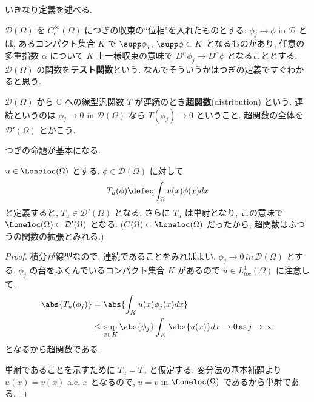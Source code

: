 \documentclass[openany, a4paper, oneside]{jsbook}
\begin{document}
いきなり定義を述べる.
\begin{defn}[テスト関数]
 $\mathcal{D}(\Omega)$ を $C_c^{\infty}(\Omega)$ につぎの収束の``位相"を入れたものとする:
 $\phi_j \to \phi$ in $\mathcal{D}$ とは,
 あるコンパクト集合 $K$ で $\supp \phi_j$, $\supp  \phi \subset K$ となるものがあり,
 任意の多重指数 $\alpha$ について $K$ 上一様収束の意味で $D^{\alpha}\phi_j \to D^{\alpha}\phi$ となることとする.
 $\mathcal{D}(\Omega)$ の関数を\textbf{テスト関数}という.
 なんでそういうかはつぎの定義ですぐわかると思う.
\end{defn}
\begin{defn}[超関数]
 $\mathcal{D}(\Omega)$ から $\mathbb{C}$ への線型汎関数
 $T$ が連続のとき\textbf{超関数}(distribution) という.
 連続というのは $\phi_j \to  0$ in $\mathcal{D}(\Omega)$ なら
 $T (\phi_j) \to 0$ ということ.
 超関数の全体を $\mathcal{D}'(\Omega)$ とかこう.
\end{defn}
つぎの命題が基本になる.
\begin{prop}[埋め込み]
 $u \in \Loneloc (\Omega)$ とする.
 $\phi \in \mathcal{D}(\Omega)$ に対して
 \begin{equation}
  T_u (\phi)
  \defeq
  \int_{\Omega}u (x)\phi (x) dx
 \end{equation}
 と定義すると, $T_u \in \mathcal{D}'(\Omega)$ となる.
 さらに $T_u$ は単射となり, この意味で $\Loneloc (\Omega) \subset \mathcal{D}'(\Omega)$ となる.
 ($C (\Omega) \subset \Loneloc (\Omega)$ だったから, 超関数はふつうの関数の拡張とみれる.)
\end{prop}
\begin{proof}
積分が線型なので, 連続であることをみればよい.
$\phi_j \to 0 \, in \, \mathcal{D}(\Omega)$ とする.
$\phi_j$ の台をふくんでいるコンパクト集合 $K$ があるので $u \in L_{loc}^1 (\Omega)$ に注意して,
\begin{equation}
 \begin{split}
  \abs{T_u (\phi_j)}
  &=
  \abs{\int_K u (x)\phi_j (x) dx} \\
  &\le
  \sup_{x \in K} \abs{\phi_j} \int_K \abs{u(x)} dx \to 0 \, \mathrm{as} \, j \to \infty
 \end{split}
\end{equation}
となるから超関数である.

単射であることを示すために $T_u = T_v$ と仮定する.
変分法の基本補題より $u (x ) = v (x)$ a.e. $x$ となるので,
$u = v$ in $\Loneloc (\Omega)$ であるから単射である.
\end{proof}
\end{document}
